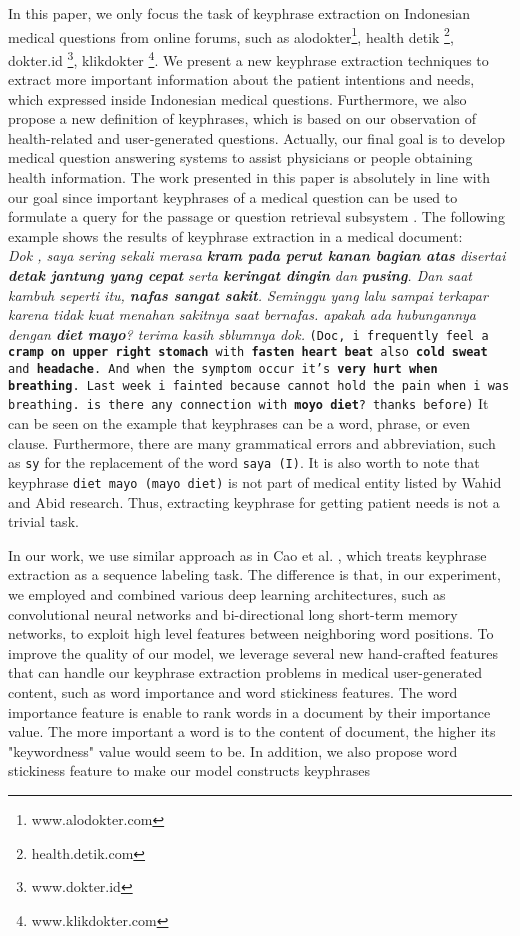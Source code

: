 In this paper, we only focus the task of keyphrase extraction on Indonesian medical questions from online forums, such as alodokter\footnote{www.alodokter.com}, health detik \footnote{health.detik.com}, dokter.id \footnote{www.dokter.id}, klikdokter \footnote{www.klikdokter.com}. We present a new keyphrase extraction techniques to extract more important information about the patient intentions and needs, which expressed inside Indonesian medical questions. Furthermore, we also propose a new definition of keyphrases, which is based on our observation of health-related and user-generated questions. Actually, our final goal is to develop medical question answering systems to assist physicians or people obtaining health information. The work presented in this paper is absolutely in line with our goal since important keyphrases of a medical question can be used to formulate a query for the passage or question retrieval subsystem \cite{gong2009improving}. The following example shows the results of keyphrase extraction in a medical document:
	\textit{\\Dok , saya sering sekali merasa \textbf{\emph{kram pada perut kanan bagian atas}} disertai \textbf{detak jantung yang cepat} serta \textbf{keringat dingin} dan \textbf{pusing}. Dan saat kambuh seperti itu, \textbf{nafas sangat sakit}. Seminggu yang lalu sampai terkapar karena tidak kuat menahan sakitnya saat bernafas. apakah ada hubungannya dengan \textbf{diet mayo}? terima kasih sblumnya dok.}
	\texttt{(Doc, i frequently feel a \textbf{cramp on upper right stomach} with \textbf{fasten heart beat} also \textbf{cold sweat} and \textbf{headache}. And when the symptom occur it's \textbf{very hurt when breathing}. Last week i fainted because cannot hold the pain when i was breathing. is there any connection with \textbf{moyo diet}? thanks before)}
It can be seen on the example that keyphrases can be a word, phrase, or even clause. Furthermore, there are many grammatical errors and abbreviation, such as \texttt{sy} for the replacement of the word \texttt{saya (I)}. It is also worth to note that keyphrase \texttt{diet mayo (mayo diet)} is not part of medical entity listed by Wahid \cite{skripsiWahid} and Abid \cite{skripsiKakAbid} research. Thus, extracting keyphrase for getting patient needs is not a trivial task. 

In our work, we use similar approach as in Cao et al. \cite{cao2010automatically}, which treats keyphrase extraction as a sequence labeling task. The difference is that, in our experiment, we employed and combined various deep learning architectures, such as convolutional neural networks and bi-directional long short-term memory networks, to exploit high level features between neighboring word positions. To improve the quality of our model, we leverage several new hand-crafted features that can handle our keyphrase extraction problems in medical user-generated content, such as word importance and word stickiness features. The word importance feature is enable to rank words in a document by their importance value. The more important a word is to the content of document, the higher its "keywordness" value would seem to be. In addition, we also propose word stickiness feature to make our model constructs keyphrases

